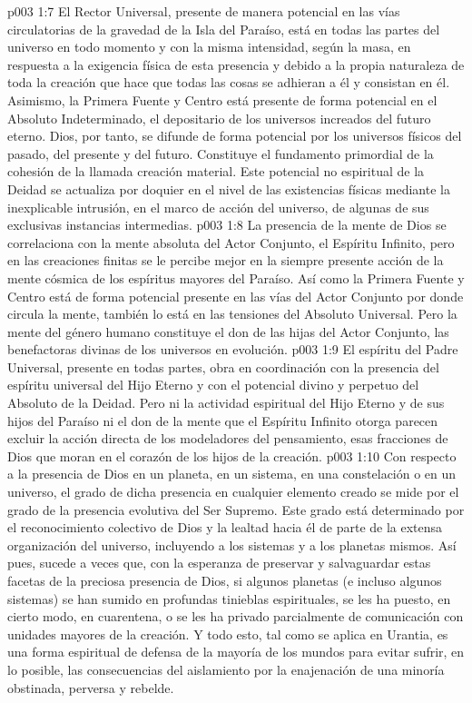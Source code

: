\vs p003 1:7 \pc El Rector Universal, presente de manera potencial en las vías circulatorias de la gravedad de la Isla del Paraíso, está en todas las partes del universo en todo momento y con la misma intensidad, según la masa, en respuesta a la exigencia física de esta presencia y debido a la propia naturaleza de toda la creación que hace que todas las cosas se adhieran a él y consistan en él. Asimismo, la Primera Fuente y Centro está presente de forma potencial en el Absoluto Indeterminado, el depositario de los universos increados del futuro eterno. Dios, por tanto, se difunde de forma potencial por los universos físicos del pasado, del presente y del futuro. Constituye el fundamento primordial de la cohesión de la llamada creación material. Este potencial no espiritual de la Deidad se actualiza por doquier en el nivel de las existencias físicas mediante la inexplicable intrusión, en el marco de acción del universo, de algunas de sus exclusivas instancias intermedias.
\vs p003 1:8 La presencia de la mente de Dios se correlaciona con la mente absoluta del Actor Conjunto, el Espíritu Infinito, pero en las creaciones finitas se le percibe mejor en la siempre presente acción de la mente cósmica de los espíritus mayores del Paraíso. Así como la Primera Fuente y Centro está de forma potencial presente en las vías del Actor Conjunto por donde circula la mente, también lo está en las tensiones del Absoluto Universal. Pero la mente del género humano constituye el don de las hijas del Actor Conjunto, las benefactoras divinas de los universos en evolución.
\vs p003 1:9 El espíritu del Padre Universal, presente en todas partes, obra en coordinación con la presencia del espíritu universal del Hijo Eterno y con el potencial divino y perpetuo del Absoluto de la Deidad. Pero ni la actividad espiritual del Hijo Eterno y de sus hijos del Paraíso ni el don de la mente que el Espíritu Infinito otorga parecen excluir la acción directa de los modeladores del pensamiento, esas fracciones de Dios que moran en el corazón de los hijos de la creación.
\vs p003 1:10 Con respecto a la presencia de Dios en un planeta, en un sistema, en una constelación o en un universo, el grado de dicha presencia en cualquier elemento creado se mide por el grado de la presencia evolutiva del Ser Supremo. Este grado está determinado por el reconocimiento colectivo de Dios y la lealtad hacia él de parte de la extensa organización del universo, incluyendo a los sistemas y a los planetas mismos. Así pues, sucede a veces que, con la esperanza de preservar y salvaguardar estas facetas de la preciosa presencia de Dios, si algunos planetas (e incluso algunos sistemas) se han sumido en profundas tinieblas espirituales, se les ha puesto, en cierto modo, en cuarentena, o se les ha privado parcialmente de comunicación con unidades mayores de la creación. Y todo esto, tal como se aplica en Urantia, es una forma espiritual de defensa de la mayoría de los mundos para evitar sufrir, en lo posible, las consecuencias del aislamiento por la enajenación de una minoría obstinada, perversa y rebelde.
